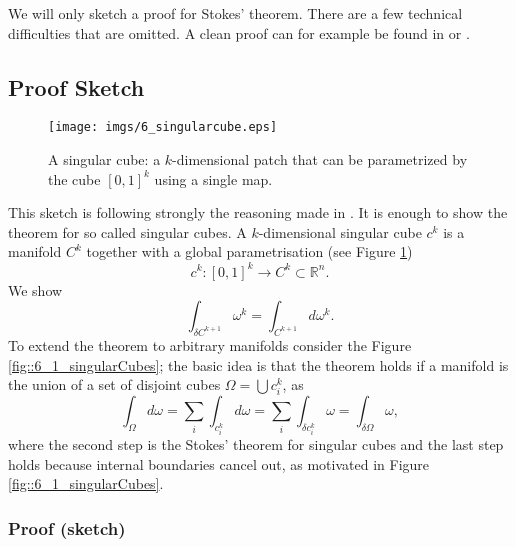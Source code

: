 We will only sketch a proof for Stokes' theorem. 
There are a few technical difficulties that are omitted. A clean proof can for example be found in \cite{globalAnalysis} or \cite{FRANKEL11}.

\subsection{Proof Sketch}

\begin{figure}%
\begin{center}
\texttt{[image: imgs/6\_singularcube.eps]}%
\end{center}
\vspace{-0.5cm}
\caption{A singular cube: a $k$-dimensional patch that can be parametrized by the cube $[0,1]^k$ using a single map.}%
\label{fig:6_singularCube}%
\end{figure}
This sketch is following strongly the reasoning made in \cite{globalAnalysis}.
It is enough to show the theorem for so called singular cubes. A $k$-dimensional singular cube $c^k$ is a manifold $C^k$ together with a global parametrisation (see Figure \ref{fig:6_singularCube})
\[c^k: [0,1]^k \to C^k \subset \mathbb R^n.\] 
We show
\[\int_{\delta C^{k+1}} \omega^{k} = \int_{C^{k+1}}d\omega^k.\] 
To extend the theorem to arbitrary manifolds consider the Figure \ref{fig::6_1_singularCubes}; the basic idea is that the theorem holds if a manifold is the union of a set of disjoint cubes $\Omega = \bigcup c^k_i$, as
\[\int_{\Omega} d\omega = \sum_i \int_{c^k_i} d\omega = \sum_i \int_{\delta c^k_i} \omega = \int_{\delta \Omega} \omega ,\]
where the second step is the Stokes' theorem for singular cubes and the last step holds because internal boundaries cancel out, as motivated in Figure \ref{fig::6_1_singularCubes}.


\subsubsection{Proof (sketch)}

